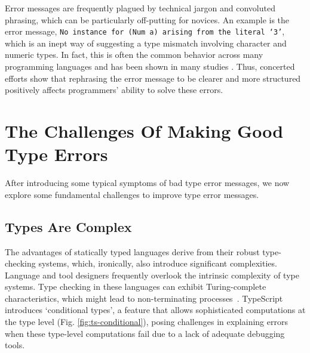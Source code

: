 Error messages are frequently plagued by technical jargon and convoluted phrasing, which can be particularly off-putting for novices. An example is the error message, \texttt{No instance for (Num a) arising from the literal `3'}, which is an inept way of suggesting a type mismatch involving character and numeric types. In fact, this is often the common behavior across many programming languages and has been shown in many studies \cite{Barik2017-gy, Tirronen2015-nr, Prather2017-dg}. Thus, concerted efforts \cite{Becker2016-kc, Barik2014-ib}  show that rephrasing the error message to be clearer and more structured positively affects programmers' ability to solve these errors.


\section{The Challenges Of Making Good Type Errors}
\label{sec:challenges}
After introducing some typical symptoms of bad type error messages, we now explore some fundamental challenges to improve type error messages.

\subsection{Types Are Complex}

The advantages of statically typed languages derive from their robust type-checking systems, which, ironically, also introduce significant complexities. Language and tool designers frequently overlook the intrinsic complexity of type systems.  Type checking in these languages can exhibit Turing-complete characteristics, which might lead to non-terminating processes~\cite{Wells1999-ob}. TypeScript introduces `conditional types', a feature that allows sophisticated computations at the type level (Fig. \ref{fig:ts-conditional}), posing challenges in explaining errors when these type-level computations fail due to a lack of adequate debugging tools.



